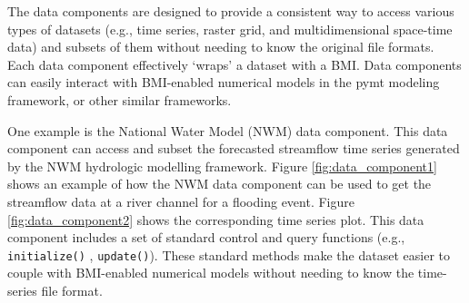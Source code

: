 \documentclass[12pt]{amsart}
\begin{document}
The data components are designed to provide a consistent way to access various types of datasets (e.g., time series, raster grid, and multidimensional space-time data) and subsets of them without needing to know the original file formats. Each data component effectively `wraps' a dataset with a BMI. Data components can easily interact with BMI-enabled numerical models in the pymt modeling framework, or other similar frameworks.

One example is the National Water Model (NWM) data component. This data component can access and subset the forecasted streamflow time series generated by the NWM hydrologic modelling framework. Figure \ref{fig:data_component1} shows an example of how the NWM data component can be used to get the streamflow data at a river channel for a flooding event. Figure \ref{fig:data_component2} shows the corresponding time series plot. This data component includes a set of standard control and query functions (e.g.,  \texttt{initialize()} , \texttt{update()}). These standard methods make the dataset easier to couple with BMI-enabled numerical models  without needing to know the time-series file format.
\end{document}
